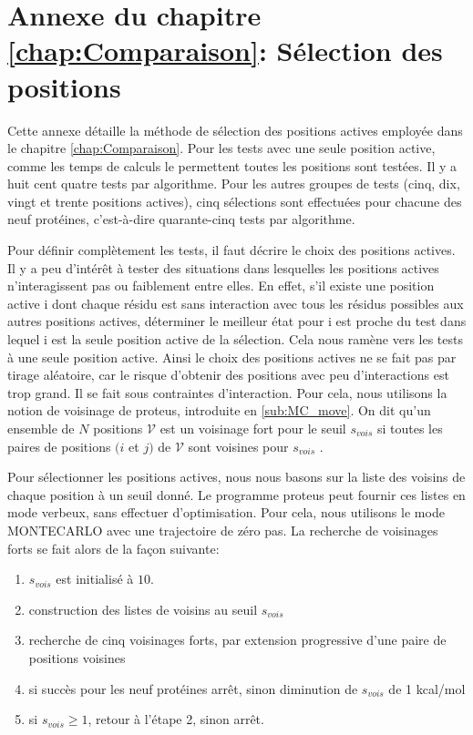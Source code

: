 \chapter*{Annexe du chapitre \ref{chap:Comparaison}: Sélection des positions }
\label{chap:annexeposi}
Cette annexe détaille la méthode de sélection des positions actives employée dans le chapitre \ref{chap:Comparaison}.
Pour les tests avec une seule position active, comme les temps de calculs le permettent toutes les positions sont testées. Il y a huit cent quatre tests par algorithme. Pour les autres groupes de tests (cinq, dix, vingt et trente positions actives), cinq sélections sont effectuées pour chacune  des neuf protéines, c'est-à-dire quarante-cinq tests par algorithme.

Pour définir complètement les tests, il faut décrire le choix des positions actives.
Il y a peu d'intérêt à tester des situations dans lesquelles les positions actives n'interagissent pas ou faiblement entre elles.
En effet, s'il existe une position active i dont chaque résidu est sans interaction avec tous les résidus possibles aux autres positions actives, déterminer le meilleur état pour i est proche du test dans lequel i est la seule position active de la sélection. Cela nous ramène vers les tests à une seule position active. Ainsi le choix des positions actives ne se fait pas par tirage aléatoire, car le risque d'obtenir des positions avec peu d'interactions est trop grand. Il se fait sous contraintes d'interaction. Pour cela, nous utilisons la notion de voisinage de proteus, introduite en \ref{sub:MC_move}. On dit qu'un ensemble de $N$ positions $\mathcal{V}$ est un \og voisinage fort \fg  pour le seuil $s_{vois}$ si toutes les paires de positions $(i$ et $j)$ de $\mathcal{V}$ sont voisines pour $s_{vois}$ .

Pour sélectionner les positions actives, nous nous basons sur la liste des voisins de chaque position à un seuil donné. Le programme proteus peut fournir ces listes en mode verbeux, sans effectuer d'optimisation. Pour cela, nous utilisons le mode MONTECARLO avec une trajectoire de zéro pas. La recherche de voisinages forts se fait alors de la façon suivante:
\begin{enumerate}
\item $s_{vois}$ est initialisé à $10$.
\item construction des listes de voisins au seuil $s_{vois}$  
\item recherche de cinq voisinages forts, par extension progressive d'une paire de positions voisines
\item si succès pour les neuf protéines arrêt, sinon diminution de  $s_{vois}$ de 1 kcal/mol 
\item si $ s_{vois} \geqslant 1 $, retour à l'étape 2, sinon arrêt.  
\end{enumerate}


